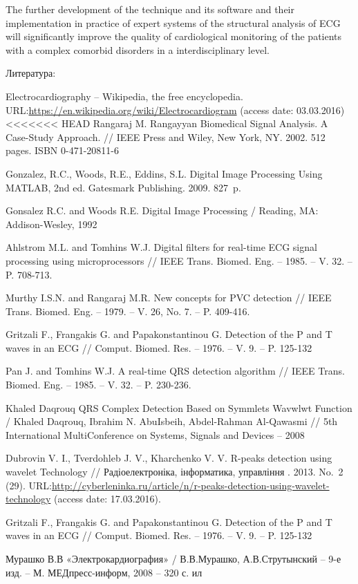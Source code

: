 \documentclass[runningheads]{AIIT}
\newcommand{\nnn}[2][rcolor]{\noindent%
\textcolor{eclr}{}\textcolor{#1}{#2}\textcolor{eclr}{}}
\begin{document}
The further development of the technique and its software and their implementation in practice of expert systems of the structural analysis of ECG will significantly improve the quality of cardiological monitoring of the patients with a complex comorbid disorders \nnn{in a interdisciplinary level}.

Литература:
%
%
 \begin{thebibliography}{99}
  Electrocardiography -- Wikipedia, the free encyclopedia. URL:\url{https://en.wikipedia.org/wiki/Electrocardiogram} (access date: 03.03.2016)
<<<<<<< HEAD
  Rangaraj M. Rangayyan Biomedical Signal Analysis. A Case-Study Approach. // IEEE Press and Wiley, New York, NY. 2002. 512 pages. ISBN 0-471-20811-6

  Gonzalez, R.C., Woods, R.E., Eddins, S.L. Digital Image Processing Using MATLAB, 2nd ed. Gatesmark Publishing. 2009. 827~p.

  Gonsalez R.C. and Woods R.E. Digital Image Processing / Reading, MA: Addison-Wesley, 1992

  Ahlstrom M.L. and Tomhins W.J. Digital filters for real-time ECG signal processing using microprocessors // IEEE Trans. Biomed. Eng. – 1985. – V. 32. – P. 708-713.

  Murthy I.S.N. and Rangaraj M.R. New concepts for PVC detection // IEEE Trans. Biomed. Eng. – 1979. – V. 26, No. 7. – P. 409-416.

  Gritzali F., Frangakis G. and Papakonstantinou G. Detection of the P and T waves in an ECG // Comput. Biomed. Res. – 1976. – V. 9. – P. 125-132

  Pan J. and Tomhins W.J. A real-time QRS detection algorithm // IEEE Trans. Biomed. Eng. – 1985. – V. 32. – P. 230-236.

  Khaled Daqrouq QRS Complex Detection Based on Symmlets Wavwlwt Function / Khaled Daqrouq, Ibrahim N. AbuIsbeih, Abdel-Rahman Al-Qawasmi // 5th International MultiConference on Systems, Signals and Devices – 2008

  Dubrovin V. I., Tverdohleb J. V., Kharchenko V. V. R-peaks detection using wavelet Technology // Радіоелектроніка, інформатика, управління . 2013. No.~2 (29). URL:\url{http://cyberleninka.ru/article/n/r-peaks-detection-using-wavelet-technology} (access date: 17.03.2016).

  Gritzali F., Frangakis G. and Papakonstantinou G. Detection of the P and T waves in an ECG // Comput. Biomed. Res. – 1976. – V. 9. – P. 125-132

  Мурашко В.В «Электрокардиография» / В.В.Мурашко, А.В.Струтынский – 9-е изд. – М. МЕДпресс-информ, 2008 – 320 с. ил

 \end{thebibliography}
\end{document}
